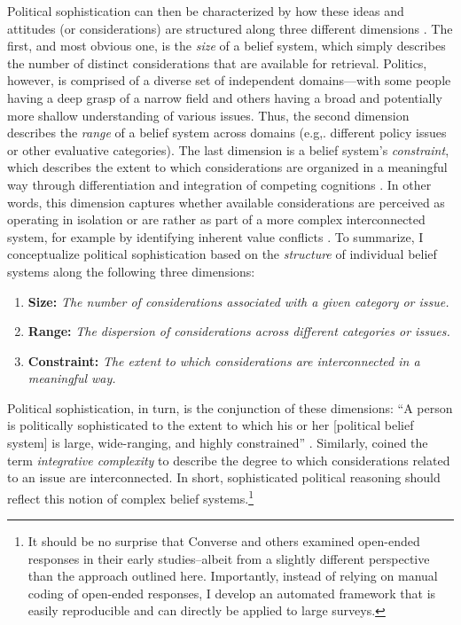 Political sophistication can then be characterized by how these ideas and attitudes (or considerations) are structured along three different dimensions \citep{luskin1987measuring}. The first, and most obvious one, is the \textit{size} of a belief system, which simply describes the number of distinct considerations that are available for retrieval. Politics, however, is comprised of a diverse set of independent domains---with some people having a deep grasp of a narrow field and others having a broad and potentially more shallow understanding of various issues. Thus, the second dimension describes the \textit{range} of a belief system across domains (e.g,. different policy issues or other evaluative categories). The last dimension is a belief system's \textit{constraint}, which describes the extent to which considerations are organized in a meaningful way through differentiation and integration of competing cognitions \citep{luskin1987measuring}. In other words, this dimension captures whether available considerations are perceived as operating in isolation or are rather as part of a more complex interconnected system, for example by identifying inherent value conflicts \citep{tetlock1983cognitive,tetlock1993cognitive}. To summarize, I conceptualize political sophistication based on the \textit{structure} of individual belief systems along the following three dimensions:

\begin{enumerate}
	\item \textbf{Size:} \textit{The number of considerations associated with a given category or issue.}
	\item \textbf{Range:} \textit{The dispersion of considerations across different categories or issues.}
	\item \textbf{Constraint:} \textit{The extent to which considerations are interconnected in a meaningful way.}
\end{enumerate}

Political sophistication, in turn, is the conjunction of these dimensions: ``A person is politically sophisticated to the extent to which his or her [political belief system] is large, wide-ranging, and highly constrained'' \citep[860]{luskin1987measuring}. Similarly, \citet{tetlock1983cognitive,tetlock1993cognitive} coined the term \textsl{integrative complexity} to describe the degree to which considerations related to an issue are interconnected. In short, sophisticated political reasoning should reflect this notion of complex belief systems.\footnote{It should be no surprise that Converse and others examined open-ended responses in their early studies--albeit from a slightly different perspective than the approach outlined here. Importantly, instead of relying on manual coding of open-ended responses, I develop an automated framework that is easily reproducible and can directly be applied to large surveys.}

